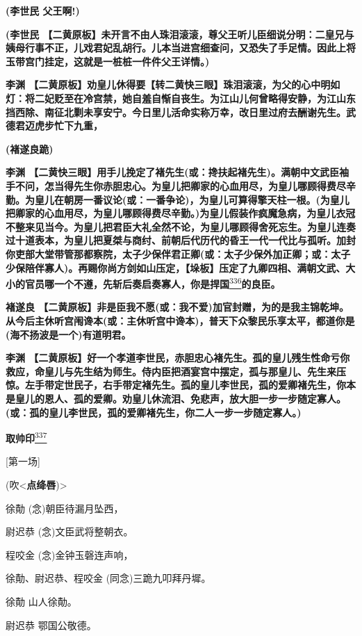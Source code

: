 \textbf{(李世民 父王啊!)}

\textbf{(李世民
【二黄原板】未开言不由人珠泪滚滚，尊父王听儿臣细说分明：二皇兄与姨母行事不正，儿戏君妃乱胡行。儿本当进宫细查问，又恐失了手足情。因此上将玉带宫门挂定，这就是一桩桩一件件父王详情。)}

\textbf{李渊
【二黄原板】劝皇儿休得要【转二黄快三眼】珠泪滚滚，为父的心中明如灯：将二妃贬至在冷宫禁，她自羞自惭自丧生。为江山儿何曾略得安静，为江山东挡西除、南征北剿未享安宁。今日里儿活命实称万幸，改日里过府去酬谢先生。武德君迈虎步忙下九重，}

\textbf{(褚遂良跪)}

\textbf{李渊
【二黄快三眼】用手儿挽定了褚先生(或：搀扶起褚先生)。满朝中文武臣袖手不问，怎当得先生你赤胆忠心。为皇儿把卿家的心血用尽，为皇儿哪顾得费尽辛勤。为皇儿在朝房一番议论(或：一番争论)，为皇儿可算得擎天柱一根。(为皇儿把卿家的心血用尽，为皇儿哪顾得费尽辛勤。)为皇儿假装作疯魔急病，为皇儿衣冠不整来见当今。为皇儿把君臣大礼全然不论，为皇儿哪顾得舍死忘生。为皇儿连奏过十道表本，为皇儿把夏桀与商纣、前朝后代历代的昏王一代一代比与孤听。加封你吏部大堂带管那都察院，太子少保伴君正卿(或：太子少保外加正卿；或：太子少保陪伴寡人)。再赐你尚方剑如山压定，【垛板】压定了九卿四相、满朝文武、大小的官员哪一个不遵，先斩后奏启奏寡人，你是捍国}\protect\hyperlink{fn336}{\textsuperscript{336}}\textbf{的良臣。}

\textbf{褚遂良
【二黄原板】非是臣我不愿(或：我不爱)加官封赠，为的是我主锦乾坤。从今后主休听宫闱谗本(或：主休听宫中谗本)，普天下众黎民乐享太平，都道你是(海不扬波是一个)有道明君。}

\textbf{李渊
【二黄原板】好一个孝道李世民，赤胆忠心褚先生。孤的皇儿残生性命亏你救应，命皇儿与先生结为师生。侍内臣把酒宴宫中摆定，孤与那皇儿、先生来压惊。左手带定世民子，右手带定褚先生。孤的皇儿李世民，孤的爱卿褚先生，你本是皇儿的恩人、孤的爱卿。劝皇儿休流泪、免悲声，放大胆一步一步随定寡人。(或：孤的皇儿李世民，孤的爱卿褚先生，你二人一步一步随定寡人。)}

\textbf{取帅印}\protect\hyperlink{fn337}{\textsuperscript{337}}

{[}第一场{]}

(吹\textless{}\textbf{点绛唇})\textgreater{}

徐勣 (念)朝臣待漏月坠西，

尉迟恭 (念)文臣武将整朝衣。

程咬金 (念)金钟玉磬连声响，

徐勣、尉迟恭、程咬金 (同念)三跪九叩拜丹墀。

徐勣 山人徐勣。

尉迟恭 鄂国公敬德。


